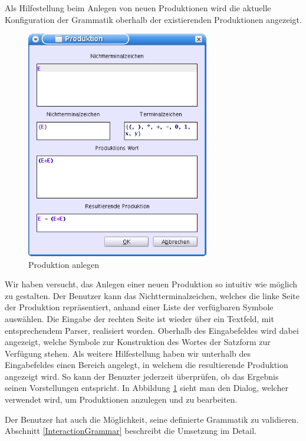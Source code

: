 Als Hilfestellung beim Anlegen von neuen Produktionen wird die aktuelle
Konfiguration der Grammatik oberhalb der existierenden Produktionen
angezeigt.\vspace{10pt}


\begin{figure}[h!]
\begin{center}
\includegraphics[width=8cm]{../images/production_dialog.png}
\caption{Produktion anlegen}
\label{FigureAddProduction}
\end{center}
\end{figure}
\vspace{10pt}

Wir haben versucht, das Anlegen einer neuen Produktion so intuitiv wie möglich
zu gestalten. Der Benutzer kann das Nichtterminalzeichen, welches die linke
Seite der Produktion repräsentiert, anhand einer Liste der
verfügbaren Symbole auswählen. Die Eingabe der rechten Seite ist
wieder über ein Textfeld, mit entsprechendem Parser, realisiert
worden. Oberhalb des Eingabefeldes wird dabei angezeigt, welche Symbole zur
Konstruktion des Wortes der Satzform zur Verfügung stehen. Als weitere
Hilfestellung haben wir unterhalb des Eingabefeldes einen Bereich angelegt,
in welchem die resultierende Produktion angezeigt wird. So kann der
Benuzter jederzeit überprüfen, ob das Ergebnis seinen
Vorstellungen entspricht. In Abbildung \ref{FigureAddProduction}
sieht man den Dialog, welcher verwendet wird, um Produktionen
anzulegen und zu bearbeiten.\vspace{10pt}

Der Benutzer hat auch die Möglichkeit, seine definierte Grammatik zu validieren.
Abschnitt \ref{InteractionGrammar} beschreibt die Umsetzung im
Detail.\vspace{10pt}


